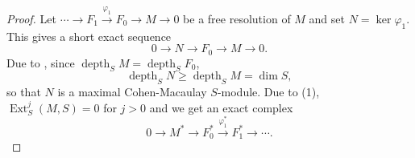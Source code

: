 \documentclass[10pt]{article}
\theoremstyle{thmstyle}
\theoremstyle{defstyle}
\renewcommand{\ge}{\geqslant}
\newcommand{\Ext}{\operatorname{Ext}}
\newcommand{\depth}{\operatorname{depth}}
\begin{document}
\begin{proof}
    Let $\cdots\to F_1\xrightarrow{\varphi_1} F_0\to M\to 0$ be a free resolution of $M$ and set $N = \ker\varphi_1$. This gives a short exact sequence 
    \begin{equation*}
        0\to N\to F_0\to M\to 0.
    \end{equation*}
    Due to , since $\depth_S M = \depth_S F_0$,
    \begin{equation*}
        \depth_S N\ge\depth_S M = \dim S,
    \end{equation*}
    so that $N$ is a maximal Cohen-Macaulay $S$-module. Due to (1),  $\Ext^j_S(M, S) = 0$ for $j > 0$ and we get an exact complex 
    \begin{equation*}
        0\to M^\ast\to F_0^\ast\xrightarrow{\varphi_1^\ast} F_1^\ast\to\cdots.
    \end{equation*}
\end{proof}
\end{document}
